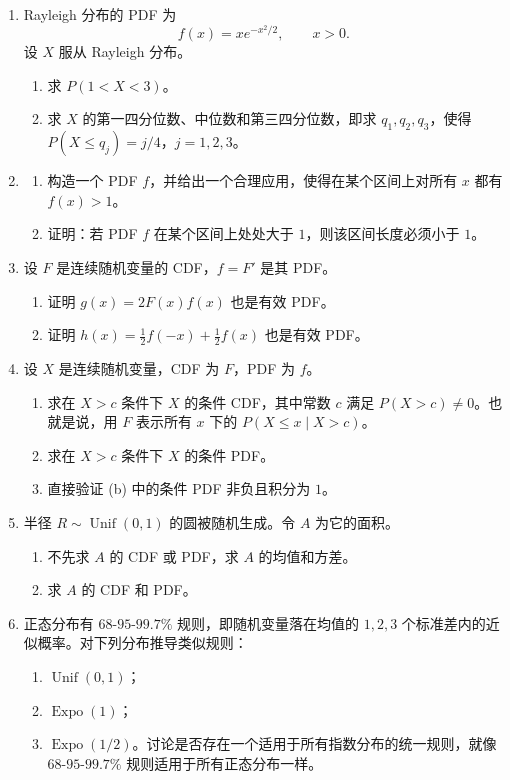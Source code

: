 \documentclass[UTF8,12pt,a4paper,fontset=fandol]{ctexart}
\begin{document}
\begin{enumerate}
  \item Rayleigh 分布的 PDF 为
  \[
    f(x)=xe^{-x^2/2},\qquad x>0.
  \]
  设 $X$ 服从 Rayleigh 分布。
  \begin{enumerate}
    \item 求 $P(1<X<3)$。
    \item 求 $X$ 的第一四分位数、中位数和第三四分位数，即求 $q_1,q_2,q_3$，使得 $P(X\le q_j)=j/4$，$j=1,2,3$。
  \end{enumerate}

  \item 
  \begin{enumerate}
    \item 构造一个 PDF $f$，并给出一个合理应用，使得在某个区间上对所有 $x$ 都有 $f(x)>1$。
    \item 证明：若 PDF $f$ 在某个区间上处处大于 $1$，则该区间长度必须小于 $1$。
  \end{enumerate}

  \item 设 $F$ 是连续随机变量的 CDF，$f=F'$ 是其 PDF。
  \begin{enumerate}
    \item 证明 $g(x)=2F(x)f(x)$ 也是有效 PDF。
    \item 证明 $h(x)=\frac12 f(-x)+\frac12 f(x)$ 也是有效 PDF。
  \end{enumerate}

  \item 设 $X$ 是连续随机变量，CDF 为 $F$，PDF 为 $f$。
  \begin{enumerate}
    \item 求在 $X>c$ 条件下 $X$ 的条件 CDF，其中常数 $c$ 满足 $P(X>c)\ne0$。也就是说，用 $F$ 表示所有 $x$ 下的 $P(X\le x\mid X>c)$。
    \item 求在 $X>c$ 条件下 $X$ 的条件 PDF。
    \item 直接验证 (b) 中的条件 PDF 非负且积分为 $1$。
  \end{enumerate}

  \item 半径 $R\sim\operatorname{Unif}(0,1)$ 的圆被随机生成。令 $A$ 为它的面积。
  \begin{enumerate}
    \item 不先求 $A$ 的 CDF 或 PDF，求 $A$ 的均值和方差。
    \item 求 $A$ 的 CDF 和 PDF。
  \end{enumerate}

  \item 正态分布有 $68$-$95$-$99.7\%$ 规则，即随机变量落在均值的 $1,2,3$ 个标准差内的近似概率。对下列分布推导类似规则：
  \begin{enumerate}
    \item $\operatorname{Unif}(0,1)$；
    \item $\operatorname{Expo}(1)$；
    \item $\operatorname{Expo}(1/2)$。讨论是否存在一个适用于所有指数分布的统一规则，就像 $68$-$95$-$99.7\%$ 规则适用于所有正态分布一样。
  \end{enumerate}


\end{enumerate}
\end{document}

